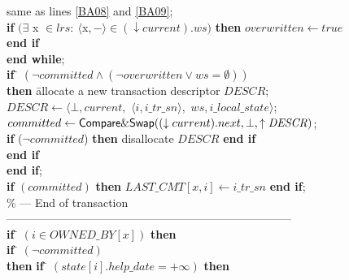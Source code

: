 \begin{figure}[h!]
{{\begin{minipage}[t]{150mm}
\begin{tabbing}
 \> \>\> same as lines \ref{BA08} and  \ref{BA09};\\


 \> \> \> {\bf if} 
    $(\exists$ {\sc x} $\in \mathit{lrs}:
               ~ \langle${\sc x}$,-\rangle \in (\downarrow current).ws)$
    {\bf then}  $overwritten  \leftarrow \mathit{true}$  {\bf end if} \\


 \>\>  {\bf end while};\\


 \>\>  {\bf if} \= $(\neg committed \wedge
                    ( \neg overwritten \vee ws=\emptyset))$\\


 \>  \>\> {\bf then} \=
   allocate a new transaction descriptor $\mathit{DESCR}$;\\


 \> \> \>\> $\mathit{DESCR} \leftarrow   
\langle  \bot, current,$ $\langle i, i\_tr\_sn \rangle,$ 
                       $ws,i\_local\_state \rangle$;\\
 

 \> \> \>\> $committed \leftarrow 
 {\sf Compare\&Swap}((\downarrow current).next, 
                     \bot,\uparrow \mathit{DESCR})$;\\


 \> \> \>\> {\bf if} ($\neg committed$) 
   {\bf then} disallocate  $\mathit{DESCR}$ {\bf end if}\\



 \> \> {\bf end if}\\

 \> {\bf end if};\\

 \> {\bf if} $(committed)$  {\bf then}
            $\mathit{LAST\_CMT}[x,i] \leftarrow i\_tr\_sn$  {\bf end if};\\

\>\> \% --- End of transaction --------------------------------------------------------------------------- \\


 \> {\bf if} \= $(i\in \mathit{OWNED\_BY}[x])$  {\bf then} \\


 \> \>  {\bf if} \= $(\neg committed)$ \\

 \> \> \> 
     {\bf then} \= {\bf if} \= $(state[i].help\_date =+\infty)$ {\bf then} \\


\end{tabbing}
\end{minipage}}}
\end{figure}
